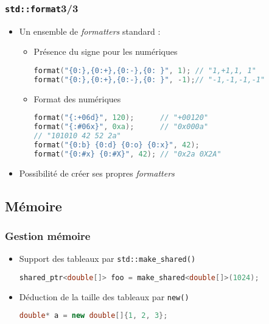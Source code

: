 \documentclass[C++.tex]{subfiles}
\begin{document}
\begin{frame}[fragile]
	\frametitle{\lstinline|std::format|\titlehfill{}3/3}
	\begin{itemize}
		\item Un ensemble de \textit{formatters} standard :
		\begin{itemize}
			\item Présence du signe pour les numériques

			\begin{lstlisting}[language=C++]
format("{0:},{0:+},{0:-},{0: }", 1); // "1,+1,1, 1"
format("{0:},{0:+},{0:-},{0: }", -1);// "-1,-1,-1,-1"\end{lstlisting}

			\item Format des numériques

			\begin{lstlisting}[language=C++]
format("{:+06d}", 120);      // "+00120"
format("{:#06x}", 0xa);      // "0x000a"
// "101010 42 52 2a"
format("{0:b} {0:d} {0:o} {0:x}", 42); 
format("{0:#x} {0:#X}", 42); // "0x2a 0X2A"\end{lstlisting}


		\end{itemize}

		\item Possibilité de créer ses propres \textit{formatters}
	\end{itemize}
\end{frame}

\subsection*{Mémoire}
\begin{frame}[fragile]
	\frametitle{Gestion mémoire}
	\begin{itemize}
		\item Support des tableaux par \lstinline|std::make_shared()|

\begin{lstlisting}[language=C++]
shared_ptr<double[]> foo = make_shared<double[]>(1024);\end{lstlisting}

		\item Déduction de la taille des tableaux par \lstinline|new()|

		\begin{lstlisting}[language=C++]
double* a = new double[]{1, 2, 3};\end{lstlisting}
	\end{itemize}
\end{frame}
\end{document}
